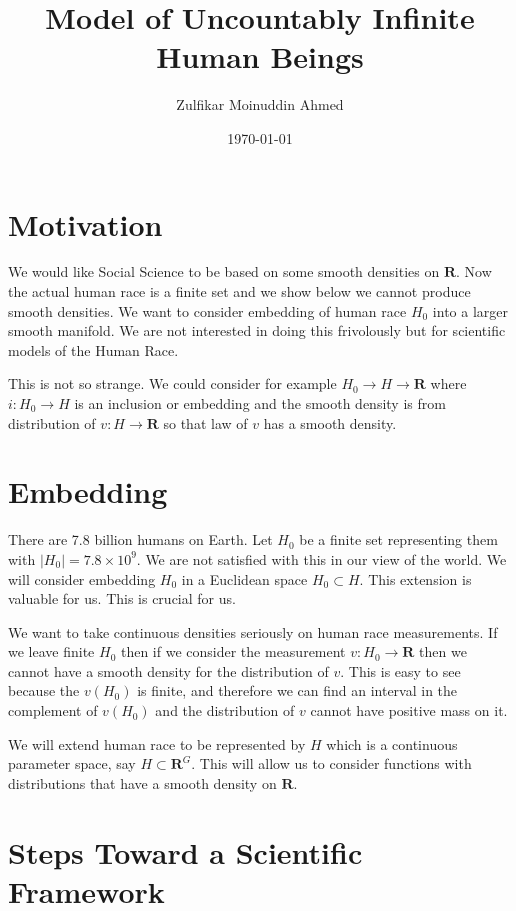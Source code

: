 \documentclass{amsart}
\title{Model of Uncountably Infinite Human Beings}
\author{Zulfikar Moinuddin Ahmed}
\date{\today}
\begin{document}
\maketitle

\section{Motivation}

We would like Social Science to be based on some smooth densities on $\mathbf{R}$.  Now the actual human race is a finite set and we show below we cannot produce smooth densities.  We want to consider embedding of human race $H_0$ into a larger smooth manifold.  We are not interested in doing this frivolously but for scientific models of the Human Race.

This is not so strange.  We could consider for example $H_0 \rightarrow H \rightarrow \mathbf{R}$ where $i: H_0 \rightarrow H$ is an inclusion or embedding and the smooth density is from distribution of $v:H\rightarrow
\mathbf{R}$ so that law of $v$ has a smooth density.

\section{Embedding}

There are 7.8 billion humans on Earth.  Let $H_0$ be a finite set representing them with $|H_0| = 7.8 \times 10^{9}$.  We are not satisfied with this in our view of the world.  We will consider embedding $H_0$ in a Euclidean space $H_0 \subset H$.  This extension is valuable for us.  This is crucial for us.  

We want to take continuous densities seriously on human race measurements.  If we leave finite $H_0$ then if we consider the measurement $v: H_0 \rightarrow \mathbf{R}$ then we cannot have a smooth density for the distribution of $v$.  This is easy to see because the $v(H_0)$ is finite, and therefore we can find an interval in the complement of $v(H_0)$ and the distribution of $v$ cannot have positive mass on it.  

We will extend human race to be represented by $H$ which is a continuous parameter space, say $H \subset \mathbf{R}^G$.  This will allow us to consider functions with distributions that have a smooth density on $\mathbf{R}$.

\section{Steps Toward a Scientific Framework}
\end{document}
